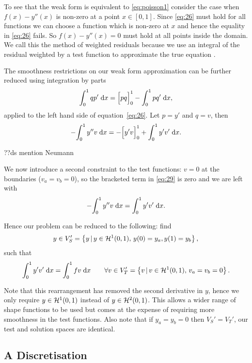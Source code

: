 To see that the weak form is equivalent to \eqref{eq:poisson1} consider the case when $f(x) - y''(x)$ is non-zero at a point $x \in [0,1]$. 
Since \eqref{eq:26} must hold for all functions we can choose a function which is non-zero at $x$ and hence the equality in \eqref{eq:26} fails.
So $f(x) - y''(x) = 0$ must hold at all points inside the domain.
We call this the method of weighted residuals because we use an integral of the residual weighted by a test function to approximate the true equation \cite[210, 214]{Zeinkiewicz1967}.

The smoothness restrictions on our weak form approximation can be further reduced using integration by parts
\begin{equation}
  {\int_0^1 qp' {\; \text{d}}{x}} = \Big[ pq \Big]_{0}^{1} - {\int_0^1 p q' {\; \text{d}}{x}},
\end{equation}
applied to the left hand side of equation~\eqref{eq:26}.
Let $p=y'$ and $q=v$, then
\begin{equation}
  -{\int_0^1  y''v  {\; \text{d}}{x}} = -\Big[ y'v \Big]_{0}^{1} + {\int_0^1  y'v'  {\; \text{d}}{x}}.
  \label{eq:29}
\end{equation}

??ds mention Neumann

We now introduce a second constraint to the test functions: $v=0$
at the boundaries (\ie $v_a=v_b=0$), so the bracketed term in \eqref{eq:29} is
zero and we are left with
\begin{equation}
  -{\int_0^1  y''v  {\; \text{d}}{x}} = {\int_0^1  y'v'  {\; \text{d}}{x}}.
\end{equation}

Hence our problem can be reduced to the following: find 
\begin{equation}
y\in V_{S}'=\left\{ {y \,|\, y \in \mathcal{H}^1(0,1),\, y(0) = y_a, y(1) = y_b } \right\},
\end{equation}
such that
\begin{equation}
  {\int_0^1  y'v'  {\; \text{d}}{x}} = {\int_0^1  fv  {\; \text{d}}{x}} \qquad 
  \forall v \in V'_{T} = \left\{ {v \,|\, v \in \mathcal{H}^1(0,1),\, v_a=v_b=0} \right\}.
  \label{eq:symmetric-weak-poisson}
\end{equation}

Note that this rearrangement has removed the second derivative in $y$, hence we only require $y \in \mathcal{H}^1(0,1)$ instead of $y \in \mathcal{H}^2(0,1)$.
This allows a wider range of shape functions to be used but comes at the expense of requiring more smoothness in the test functions.
Also note that if $y_a = y_b = 0$ then $V_{S}'=V_{T}'$, our test and solution spaces are identical.

\subsection{A Discretisation}


